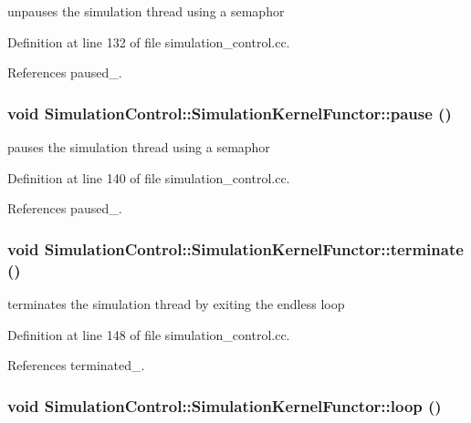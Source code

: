 unpauses the simulation thread using a semaphor 

Definition at line 132 of file simulation\_\-control.cc.

References paused\_\-.\hypertarget{class_simulation_control_1_1_simulation_kernel_functor_1228e457d2a780ba379b36e66f57e8cd}{
\subsubsection[pause]{\setlength{\rightskip}{0pt plus 5cm}void SimulationControl::SimulationKernelFunctor::pause ()}}
\label{class_simulation_control_1_1_simulation_kernel_functor_1228e457d2a780ba379b36e66f57e8cd}


pauses the simulation thread using a semaphor 

Definition at line 140 of file simulation\_\-control.cc.

References paused\_\-.\hypertarget{class_simulation_control_1_1_simulation_kernel_functor_afb53670154b6460d79358f9b866ef24}{
\subsubsection[terminate]{\setlength{\rightskip}{0pt plus 5cm}void SimulationControl::SimulationKernelFunctor::terminate ()}}
\label{class_simulation_control_1_1_simulation_kernel_functor_afb53670154b6460d79358f9b866ef24}


terminates the simulation thread by exiting the endless loop 

Definition at line 148 of file simulation\_\-control.cc.

References terminated\_\-.\hypertarget{class_simulation_control_1_1_simulation_kernel_functor_44aaca5c7b6605436b889d41cc4b9472}{
\subsubsection[loop]{\setlength{\rightskip}{0pt plus 5cm}void SimulationControl::SimulationKernelFunctor::loop ()}}
\label{class_simulation_control_1_1_simulation_kernel_functor_44aaca5c7b6605436b889d41cc4b9472}



